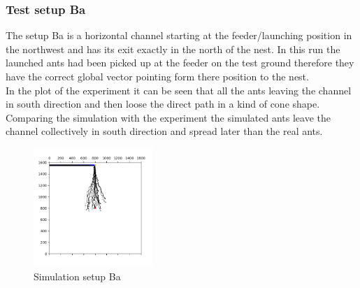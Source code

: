 \documentclass[11pt]{article}
\begin{document}
	\subsubsection{Test setup Ba}
		The setup Ba is a horizontal channel starting at the feeder/launching position in the northwest and has its exit exactly in the north of the nest. In this run the launched ants had been picked up at the feeder on the test ground therefore they have the correct global vector pointing form there position to the nest. \\
In the plot of the experiment it can be seen that all the ants leaving the channel in south direction and then loose the direct path in a kind of cone shape. Comparing the simulation with the experiment the simulated ants leave the channel collectively in south direction and spread later than the real ants. 
\begin{figure}
	\includegraphics[width=0.4\textwidth]{test_Ba.png}
	\caption{Simulation setup Ba}
	\label{fig:Ba}
\end{figure}
\end{document}
